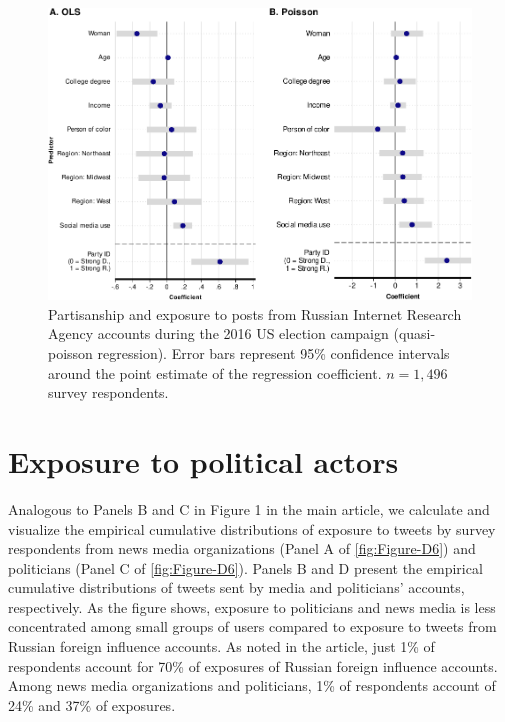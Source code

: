\documentclass[
  12pt,
]{article}
\begin{document}
\begin{figure}[h]

{\centering \includegraphics[width=1\linewidth,height=0.6\textheight]{Appendix_files/figure-latex/Figure-C5-1} 

}

\caption{Partisanship and exposure to posts from Russian Internet Research Agency accounts during the 2016 US election campaign (quasi-poisson regression). Error bars represent 95\% confidence intervals around the point estimate of the regression coefficient. $n = 1,496$ survey respondents.}\label{fig:Figure-C5}
\end{figure}

\clearpage

\hypertarget{exposure-to-political-actors}{%
\section{Exposure to political actors}\label{exposure-to-political-actors}}

Analogous to Panels B and C in Figure 1 in the main article, we calculate and visualize the empirical cumulative distributions of exposure to tweets by survey respondents from news media organizations (Panel A of \autoref{fig:Figure-D6}) and politicians (Panel C of \autoref{fig:Figure-D6}). Panels B and D present the empirical cumulative distributions of tweets sent by media and politicians' accounts, respectively. As the figure shows, exposure to politicians and news media is less concentrated among small groups of users compared to exposure to tweets from Russian foreign influence accounts. As noted in the article, just 1\% of respondents account for 70\% of exposures of Russian foreign influence accounts. Among news media organizations and politicians, 1\% of respondents account of 24\% and 37\% of exposures.
\end{document}
